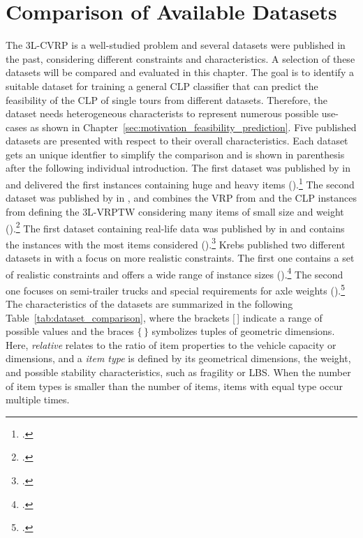 \chapter{Comparison of Available Datasets}
\label{sec:dataset_selection}

The \gls{3L-CVRP} is a well-studied problem and several datasets were published in the past, considering
different constraints and characteristics. A selection of these datasets will be compared and evaluated
in this chapter. The goal is to identify a suitable dataset for training a general \gls{CLP} classifier that can predict
the feasibility of the \gls{CLP} of single tours from different datasets. Therefore, the dataset needs
heterogeneous characterists to represent numerous possible use-cases
as shown in Chapter~\ref{sec:motivation_feasibility_prediction}. Five published  datasets are presented with respect to their overall characteristics.
Each dataset gets an unique identfier to simplify the comparison and is shown in parenthesis
after the following individual introduction. The first  dataset was published by \citeauthor{gendreau_tabu_2006} in
\citeyear{gendreau_tabu_2006} and delivered the first  instances containing huge and heavy items (\gendreauDataSet).\footcite[cf.][]{gendreau_tabu_2006}
The second dataset was published by \citeauthor{moura_integrated_2009} in \citeyear{moura_integrated_2009},
and combines the \gls{VRP} from \citeauthor{solomon_algorithms_1987} and the \gls{CLP} instances from
\citeauthor{bischoff_issues_1995} defining the \gls{3L-VRPTW} considering
many items of small size and weight (\mouraDataSet).\footcites[cf.][]{solomon_algorithms_1987,bischoff_issues_1995}[][]{moura_integrated_2009}
The first dataset containing real-life data was published by \citeauthor{ceschia_local_2013} in \citeyear{ceschia_local_2013}
and contains the instances with the most items considered (\ceschiaDataSet).\footcite[cf.][]{ceschia_local_2013}
Krebs published two different datasets in
\citeyear{krebs_advanced_2021} with a focus on more realistic constraints. The first one contains a set
of realistic constraints and offers a wide range of instance sizes (\krebsADataSet).\footcite[cf.][]{krebs_advanced_2021}
The second one focuses on semi-trailer trucks and special requirements for axle weights (\krebsBDataSet).\footcite[cf.][]{krebs_axle_2021}
The characteristics of the datasets are summarized in the following Table~\ref{tab:dataset_comparison},
where the brackets [\,] indicate a range of possible values and the braces $\{\,\}$ symbolizes tuples of geometric dimensions.
Here, \textit{relative} relates to the ratio of item properties to the vehicle capacity or dimensions,
and a \textit{item type} is defined by its geometrical dimensions, the weight, and possible stability characteristics, such as fragility or \gls{LBS}.
When the number of item types is smaller than the number of items, items with equal type occur multiple times.

